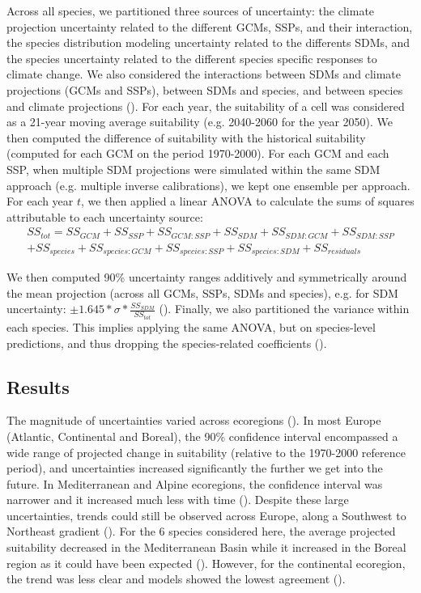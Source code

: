 \documentclass[letterpaper,8pt]{article}  %
\begin{document}
\begin{doublespacing}
\begin{linenumbers}
Across all species, we partitioned three sources of uncertainty: the climate projection uncertainty related to the different GCMs, SSPs, and their interaction, the species distribution modeling uncertainty related to the differents SDMs, and the species uncertainty related to the different species specific responses to climate change. We also considered the interactions between SDMs and climate projections (GCMs and SSPs), between SDMs and species, and between species and climate projections (). For each year, the suitability of a cell was considered as a 21-year moving average suitability (e.g. 2040-2060 for the year 2050). We then computed the difference of suitability with the historical suitability (computed for each GCM on the period 1970-2000). For each GCM and each SSP, when multiple SDM projections were simulated within the same SDM approach (e.g. multiple inverse calibrations), we kept one ensemble per approach. For each year $t$, we then applied a linear ANOVA to calculate the sums of squares attributable to each uncertainty source:
\begin{multline*}
{SS}_{tot} = {SS}_{GCM} + {SS}_{SSP} + {SS}_{GCM:SSP} + {SS}_{SDM} + {SS}_{SDM:GCM} + {SS}_{SDM:SSP}\\+ {SS}_{species} + {SS}_{species:GCM} + {SS}_{species:SSP} + {SS}_{species:SDM} + {SS}_{residuals}
\end{multline*}

We then computed 90\% uncertainty ranges additively and symmetrically around the mean projection (across all GCMs, SSPs, SDMs and species), e.g. for SDM uncertainty: $\pm1.645*\sigma*\frac{{SS}_{SDM}}{{SS}_{tot}}$ ().
Finally, we also partitioned the variance within each species. This implies applying the same ANOVA, but on species-level predictions, and thus dropping the species-related coefficients ().

\subsection{Results}

The magnitude of uncertainties varied across ecoregions (). In most Europe (Atlantic, Continental and Boreal), the 90\% confidence interval encompassed a wide range of projected change in suitability (relative to the 1970-2000 reference period), and uncertainties increased significantly the further we get into the future. In Mediterranean and Alpine ecoregions, the confidence interval was narrower and it increased much less with time (). Despite these large uncertainties, trends could still be observed across Europe, along a Southwest to Northeast gradient (). For the 6 species considered here, the average projected suitability decreased in the Mediterranean Basin while it increased in the Boreal region as it could have been expected (). However, for the continental ecoregion, the trend was less clear and models showed the lowest agreement ().


\end{linenumbers}
\end{doublespacing}
\end{document}

